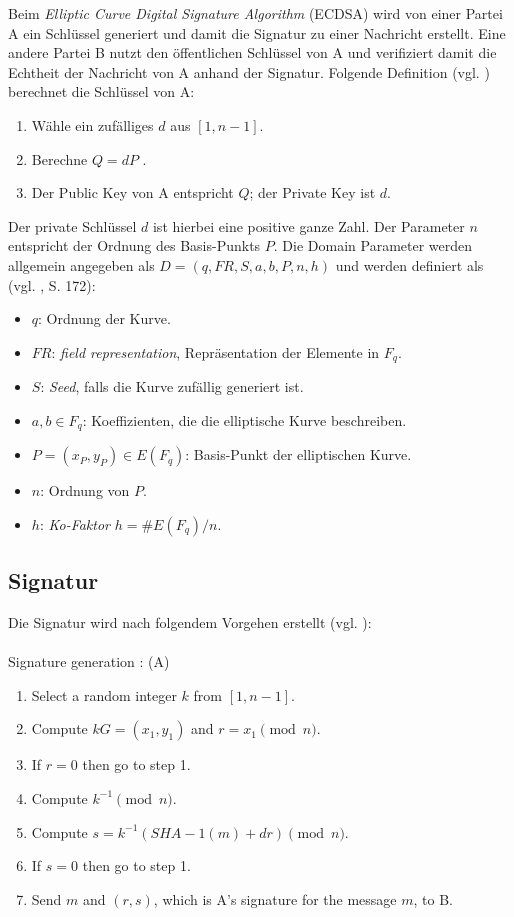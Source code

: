 Beim \textit{Elliptic Curve Digital Signature Algorithm} (ECDSA) wird von einer Partei A ein Schlüssel generiert und damit die Signatur zu einer Nachricht erstellt. Eine andere Partei B nutzt den öffentlichen Schlüssel von A und verifiziert damit die Echtheit der Nachricht von A anhand der Signatur. Folgende Definition (vgl. \cite{hwimp}) berechnet die Schlüssel von A: \\

\begin{enumerate}
\item Wähle ein zufälliges $d$ aus $[1, n-1]$.
\item Berechne $Q = dP$ .
\item Der Public Key von A entspricht $Q$; der Private Key ist $d$. \\
\end{enumerate}

Der private Schlüssel $d$ ist hierbei eine positive ganze Zahl. Der Parameter $n$ entspricht der Ordnung des Basis-Punkts $P$. Die Domain Parameter werden allgemein angegeben als $D = (q,FR, S,a,b, P,n,h)$ und werden definiert als (vgl. \cite{guide}, S. 172): \\

\begin{itemize}
\item $q$: Ordnung der Kurve.
\item $FR$: \textit{field representation}, Repräsentation der Elemente in $F_q$.
\item $S$: \textit{Seed}, falls die Kurve zufällig generiert ist.
\item $a,b \in F_q$: Koeffizienten, die die elliptische Kurve beschreiben.
\item $P = (x_P,y_P) \in E(F_q)$: Basis-Punkt der elliptischen Kurve.
\item $n$: Ordnung von $P$.
\item $h$: \textit{Ko-Faktor} $h = \#E(F_q)/n$.
\end{itemize}

\subsection{Signatur}

Die Signatur wird nach folgendem Vorgehen erstellt (vgl. \cite{hwimp}):
\\ \\
Signature generation : (A)
\begin{enumerate}
\item Select a random integer $k$ from $[1, n - 1]$.
\item Compute $k G = (x_1, y_1)$ and $r = x_1 \pmod{n} $.
\item If $r = 0$ then go to step 1.
\item Compute $k^{-1} \pmod{n}$.
\item Compute $s = k^{-1}(SHA - 1(m) + dr)\pmod{n}$.
\item If $s = 0$ then go to step 1.
\item Send $m$ and $(r, s)$, which is A’s signature for the message $m$, to B.
\end{enumerate}

